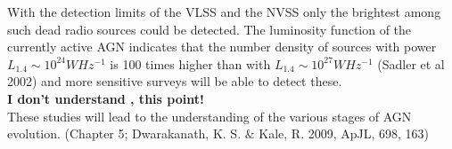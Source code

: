\documentclass[12pt]{report}
\begin{document}
\begin{itemize}
With the detection limits of the VLSS and the NVSS only the brightest among such dead radio sources could be detected. The luminosity function of the currently active AGN indicates that the number density of sources with power $L_{1.4} \sim 10^{24} W Hz^{-1}$ is 100 times higher than with $L_{1.4} \sim 10^{27} W Hz^{-1}$ (Sadler et al 2002) and more sensitive surveys will be able to detect these.\\
\textbf{I don't understand , this point!}\\

 These studies will
lead to the understanding of the various stages of AGN evolution. (Chapter
5; Dwarakanath, K. S. $\&$ Kale, R. 2009, ApJL, 698, 163)


\end{itemize}
\end{document}
